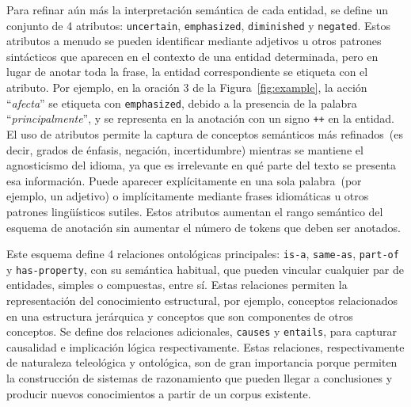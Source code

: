 Para refinar aún más la interpretación semántica de cada entidad, se define un conjunto de 4 atributos:
\texttt{uncertain}, \texttt{emphasized}, \texttt{diminished} y \texttt{negated}.
Estos atributos a menudo se pueden identificar mediante adjetivos u otros patrones sintácticos que aparecen en el contexto de una entidad determinada, pero en lugar de anotar toda la frase, la entidad correspondiente se etiqueta con el atributo.
Por ejemplo, en la oración 3 de la Figura~\ref{fig:example}, la acción ``\textit{afecta}'' se etiqueta con \texttt{emphasized}, debido a la presencia de la palabra ``\textit{principalmente}'', y se representa en la anotación con un signo \texttt{++} en la entidad.
El uso de atributos permite la captura de conceptos semánticos más refinados~(es decir, grados de énfasis, negación, incertidumbre) mientras se mantiene el agnosticismo del idioma, ya que es irrelevante en qué parte del texto se presenta esa información.
Puede aparecer explícitamente en una sola palabra~(por ejemplo, un adjetivo) o implícitamente mediante frases idiomáticas u otros patrones lingüísticos sutiles.
Estos atributos aumentan el rango semántico del esquema de anotación sin aumentar el número de tokens que deben ser anotados.

Este esquema define 4 relaciones ontológicas principales: \texttt{is-a}, \texttt{same-as}, \texttt{part-of} y \texttt{has-property}, con su semántica habitual, que pueden vincular cualquier par de entidades, simples o compuestas, entre sí.
Estas relaciones permiten la representación del conocimiento estructural, por ejemplo, conceptos relacionados en una estructura jerárquica y conceptos que son componentes de otros conceptos.
Se define dos relaciones adicionales, \texttt{causes} y \texttt{entails}, para capturar causalidad e implicación lógica respectivamente.
Estas relaciones, respectivamente de naturaleza teleológica y ontológica, son de gran importancia porque permiten la construcción de sistemas de razonamiento que pueden llegar a conclusiones y producir nuevos conocimientos a partir de un corpus existente.

